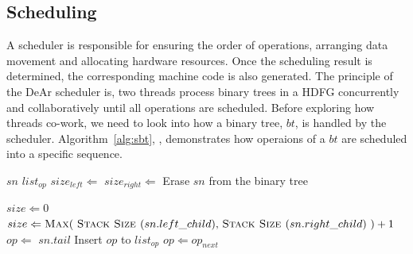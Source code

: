 \subsection{Scheduling}

A scheduler is responsible for ensuring the order of operations, 
arranging data movement and allocating hardware resources.
Once the scheduling result is determined, the corresponding machine code is also generated.
The principle of the DeAr scheduler is, 
two threads process binary trees in a HDFG concurrently and collaboratively until all operations are scheduled.
Before exploring how threads co-work, we need to look into how a binary tree, $bt$, is handled by the scheduler.
Algorithm~\ref{alg:sbt}, , 
demonstrates how operaions of a $bt$ are scheduled into a specific sequence.
\begin{algorithm}[!ht]
    \caption{}
    \begin{algorithmic}[1]
        \Require    $sn$
        \Ensure     $list_{op}$
                \label{line:sbts}
        \State $size_{left} \Leftarrow$ 
        \State $size_{right} \Leftarrow$ 
        \State {}
        \Else
        \State {}
        \EndIf
        \EndIf
        \State {}   
        \State Erase $sn$ from the binary tree
        \State {}
        \EndIf

        \label{line:sbte}
        \Statex
          \label{line:gsss}
        \State $size \Leftarrow 0$
        \Else
        \State $size \Leftarrow \text{\textproc{Max}(\ \textproc{Stack Size }($sn.left\_child$), \textproc{Stack Size }($sn.right\_child$)\ )} + 1$
        \EndIf
        \State {}
        \EndFunction                    \label{line:gsse}
        \Statex
          \label{line:ssns}
        \State   $op \Leftarrow$ $sn.tail$
        \Do   
        \State Insert $op$ to $list_{op}$
        \State $op \Leftarrow op_{next}$
        \EndFunction                            \label{line:ssne}

    \end{algorithmic}
    \label{alg:sbt}
\end{algorithm}

